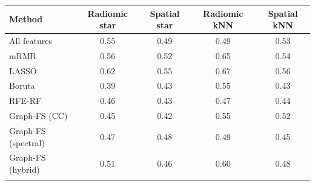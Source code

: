 \begin{tabular}{@{}lcccc@{}}
\toprule
Method & Radiomic star & Spatial star & Radiomic kNN & Spatial kNN \\
\midrule
All features & 0.55 & 0.49 & 0.49 & 0.53 \\
mRMR & 0.56 & 0.52 & 0.65 & 0.54 \\
LASSO & 0.62 & 0.55 & 0.67 & 0.56 \\
Boruta & 0.39 & 0.43 & 0.55 & 0.43 \\
RFE-RF & 0.46 & 0.43 & 0.47 & 0.44 \\
Graph-FS (CC) & 0.45 & 0.42 & 0.55 & 0.52 \\
Graph-FS (spectral) & 0.47 & 0.48 & 0.49 & 0.45 \\
Graph-FS (hybrid) & 0.51 & 0.46 & 0.60 & 0.48 \\
\botrule
\end{tabular}
